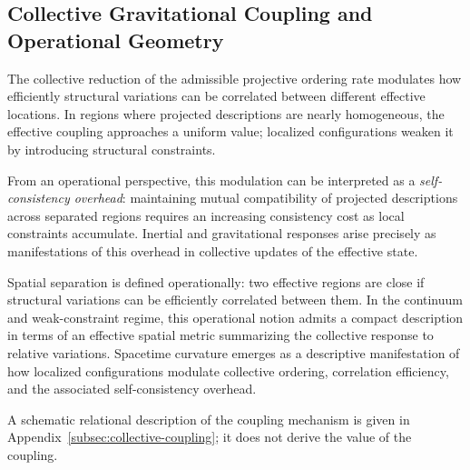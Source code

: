 \subsection{Collective Gravitational Coupling and Operational Geometry}
  \label{subsec:collective-gravitational-coupling-and-operational-geometry}

  The collective reduction of the admissible projective ordering rate
  modulates how efficiently structural variations can be correlated between
  different effective locations.
  In regions where projected descriptions are nearly homogeneous, the
  effective coupling approaches a uniform value; localized configurations
  weaken it by introducing structural constraints.

  From an operational perspective, this modulation can be interpreted as a
  \emph{self-consistency overhead}: maintaining mutual compatibility of
  projected descriptions across separated regions requires an increasing
  consistency cost as local constraints accumulate.
  Inertial and gravitational responses arise precisely as manifestations of
  this overhead in collective updates of the effective state.

  Spatial separation is defined operationally: two effective regions are
  close if structural variations can be efficiently correlated between
  them.
  In the continuum and weak-constraint regime, this operational notion
  admits a compact description in terms of an effective spatial metric
  summarizing the collective response to relative variations.
  Spacetime curvature emerges as a descriptive manifestation of how
  localized configurations modulate collective ordering, correlation
  efficiency, and the associated self-consistency overhead.

  A schematic relational description of the coupling mechanism is
  given in Appendix~\ref{subsec:collective-coupling}; it does not derive the value of the coupling.
